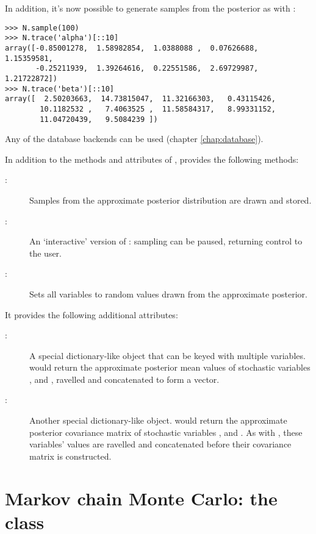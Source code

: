In addition, it's now possible to generate samples from the posterior as with :
\begin{verbatim}
>>> N.sample(100)
>>> N.trace('alpha')[::10]
array([-0.85001278,  1.58982854,  1.0388088 ,  0.07626688,  1.15359581,
       -0.25211939,  1.39264616,  0.22551586,  2.69729987,  1.21722872])
>>> N.trace('beta')[::10]
array([  2.50203663,  14.73815047,  11.32166303,   0.43115426,
        10.1182532 ,   7.4063525 ,  11.58584317,   8.99331152,
        11.04720439,   9.5084239 ])
\end{verbatim}
Any of the database backends can be used (chapter \ref{chap:database}).

\bigskip
In addition to the methods and attributes of ,  provides the following methods:
\begin{description}
    \item[:] Samples from the approximate posterior distribution are drawn and stored.
    \item[:] An `interactive' version of : sampling can be paused, returning control to the user.
    \item[:] Sets all variables to random values drawn from the approximate posterior.
\end{description}
It provides the following additional attributes:
\begin{description}
    \item[:] A special dictionary-like object that can be keyed with multiple variables.  would return the approximate posterior mean values of stochastic variables ,  and , ravelled and concatenated to form a vector.
    \item[:] Another special dictionary-like object.  would return the approximate posterior covariance matrix of stochastic variables ,  and . As with , these variables' values are ravelled and concatenated before their covariance matrix is constructed.
\end{description}

\hypertarget{mcmc}{}
\section[Markov chain Monte Carlo: the MCMC class]{Markov chain Monte
Carlo: the  class} \label{sec:mcmc}

